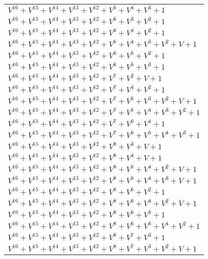 \documentclass[12pt]{article}
\begin{document}
\begin{adjustwidth}{-4cm}{}
\begin{center}
\begin{longtable}{|l|}
$V^{16}  +V^{15}  +V^{14}  +V^{13}  +V^{12}  +V^{5}  +V^{4}  +V^{3}  + 1$ \\
$V^{16}  +V^{15}  +V^{14}  +V^{13}  +V^{12}  +V^{6}  +V^{3}  +V^{2}  + 1$ \\
$V^{16}  +V^{15}  +V^{14}  +V^{13}  +V^{12}  +V^{6}  +V^{4}  +V^{2}  + 1$ \\
$V^{16}  +V^{15}  +V^{14}  +V^{13}  +V^{12}  +V^{6}  +V^{4}  +V^{3}  +V^{2}  + V + 1$ \\
$V^{16}  +V^{15}  +V^{14}  +V^{13}  +V^{12}  +V^{6}  +V^{5}  +V^{2}  + 1$ \\
$V^{16}  +V^{15}  +V^{14}  +V^{13}  +V^{12}  +V^{6}  +V^{5}  +V^{3}  + 1$ \\
$V^{16}  +V^{15}  +V^{14}  +V^{13}  +V^{12}  +V^{7}  +V^{2}  + V + 1$ \\
$V^{16}  +V^{15}  +V^{14}  +V^{13}  +V^{12}  +V^{7}  +V^{4}  +V^{2}  + 1$ \\
$V^{16}  +V^{15}  +V^{14}  +V^{13}  +V^{12}  +V^{7}  +V^{5}  +V^{3}  +V^{2}  + V + 1$ \\
$V^{16}  +V^{15}  +V^{14}  +V^{13}  +V^{12}  +V^{7}  +V^{5}  +V^{4}  +V^{3}  +V^{2}  + 1$ \\
$V^{16}  +V^{15}  +V^{14}  +V^{13}  +V^{12}  +V^{7}  +V^{6}  +V^{4}  + 1$ \\
$V^{16}  +V^{15}  +V^{14}  +V^{13}  +V^{12}  +V^{7}  +V^{6}  +V^{5}  +V^{4}  +V^{3}  + 1$ \\
$V^{16}  +V^{15}  +V^{14}  +V^{13}  +V^{12}  +V^{8}  +V^{3}  + V + 1$ \\
$V^{16}  +V^{15}  +V^{14}  +V^{13}  +V^{12}  +V^{8}  +V^{4}  + V + 1$ \\
$V^{16}  +V^{15}  +V^{14}  +V^{13}  +V^{12}  +V^{8}  +V^{5}  +V^{4}  +V^{2}  + V + 1$ \\
$V^{16}  +V^{15}  +V^{14}  +V^{13}  +V^{12}  +V^{8}  +V^{5}  +V^{4}  +V^{3}  + V + 1$ \\
$V^{16}  +V^{15}  +V^{14}  +V^{13}  +V^{12}  +V^{8}  +V^{6}  +V^{2}  + 1$ \\
$V^{16}  +V^{15}  +V^{14}  +V^{13}  +V^{12}  +V^{8}  +V^{6}  +V^{4}  +V^{2}  + V + 1$ \\
$V^{16}  +V^{15}  +V^{14}  +V^{13}  +V^{12}  +V^{8}  +V^{6}  +V^{5}  + 1$ \\
$V^{16}  +V^{15}  +V^{14}  +V^{13}  +V^{12}  +V^{8}  +V^{6}  +V^{5}  +V^{4}  +V^{2}  + 1$ \\
$V^{16}  +V^{15}  +V^{14}  +V^{13}  +V^{12}  +V^{8}  +V^{7}  +V^{3}  + 1$ \\
$V^{16}  +V^{15}  +V^{14}  +V^{13}  +V^{12}  +V^{8}  +V^{7}  +V^{3}  +V^{2}  + V + 1$ \\

\end{longtable}
\end{center}
\end{adjustwidth}
\end{document}
